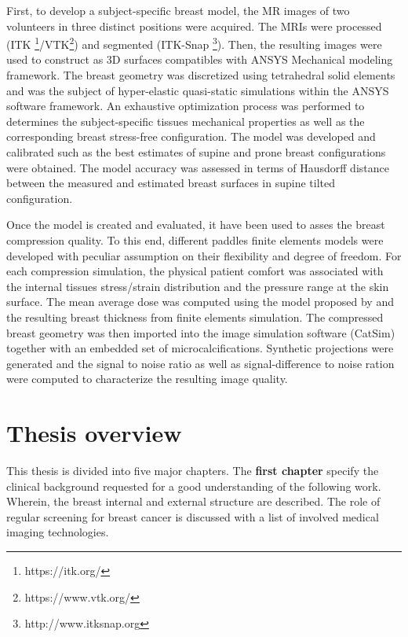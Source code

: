 First, to develop a subject-specific breast model, the MR images of two volunteers in three distinct positions were acquired. The MRIs were processed (ITK \footnote{https://itk.org/}/VTK\footnote{https://www.vtk.org/}) and  segmented (ITK-Snap \footnote{http://www.itksnap.org}). Then, the resulting images were used to construct as 3D surfaces compatibles with ANSYS Mechanical modeling framework. The breast geometry was discretized using tetrahedral solid elements and was the subject of hyper-elastic quasi-static simulations within the ANSYS software framework. An exhaustive optimization process was performed to determines the subject-specific tissues mechanical properties as well as the corresponding breast stress-free configuration. The model was developed and calibrated such as the best estimates of supine and prone breast configurations were obtained. The model accuracy was assessed in terms of Hausdorff distance between the measured and estimated breast surfaces in supine tilted configuration.

Once the model is created and evaluated, it have been used to asses the breast compression quality. To this end, different paddles finite elements models were developed with peculiar assumption on their flexibility and degree of freedom. For each compression simulation, the physical patient comfort was associated with the internal tissues stress/strain distribution and the pressure range at the skin surface. The mean average dose was computed using the model proposed by \cite{dance_additional_2000} and the resulting breast thickness from finite elements simulation. The compressed breast geometry was then imported into the image simulation software (CatSim) together with an embedded set of microcalcifications. Synthetic projections were generated and the signal to noise ratio as well as signal-difference to noise ration were computed to characterize the resulting image quality.   

\cleardoublepage
\chapter*{Thesis overview}\label{section:thesisoverview}

This thesis is divided into five major chapters. The \textbf{first chapter} specify the clinical background  requested for a good understanding of the following work. Wherein, the breast internal and external structure are described. The role of regular screening for breast cancer is discussed with a list of involved medical imaging technologies. 

